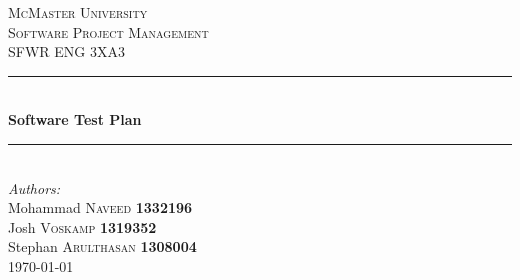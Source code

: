 \documentclass[12pt]{article}
\begin{document}
\sloppy

\begin{titlepage}

\newcommand{\HRule}{\rule{\linewidth}{0.5mm}} %

\center %


\textsc{\LARGE McMaster University}\\[1.5cm] %
\textsc{\Large Software Project Management}\\[0.5cm] %
\textsc{\large SFWR ENG 3XA3}\\[0.5cm] %


\HRule \\[0.4cm]
{ \huge \bfseries Software Test Plan}\\[0.4cm] %
\HRule \\[1.5cm]




\Large \emph{Authors:}\\
Mohammad \textsc{Naveed} \textbf{1332196} \\ %
Josh \textsc{Voskamp} \textbf{1319352} \\
Stephan \textsc{Arulthasan} \textbf{1308004} \\[3cm]

{\large \today}\\[3cm] %


\end{titlepage}
\end{document}
